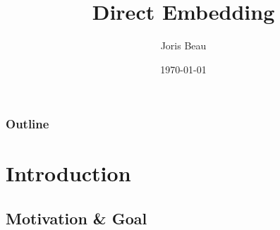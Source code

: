 \documentclass{beamer}
\title[Direct Embedding]{Direct Embedding} %
\author{Joris Beau} %
\institute[EPFL] %
{
EPFL - LAMP \\ %
Project in computer science\\


Directed by \textbf{Martin Odersky}, Supervised by \textbf{Vojin Jovanovic}\\
\subject{Computer Science}
\medskip
}
\date{\today} %
\begin{document}
\begin{frame}
\titlepage %
\end{frame}

\begin{frame}
\frametitle{Outline} %
\tableofcontents %
\end{frame}


\section{Introduction} %

\subsection{Motivation \& Goal } %

%
\end{document}
